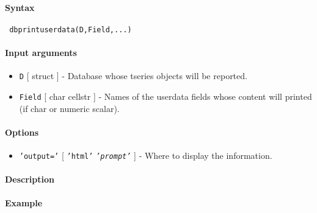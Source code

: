 


	\paragraph{Syntax}
 
 \begin{verbatim}
 dbprintuserdata(D,Field,...)
 \end{verbatim}
 
 \paragraph{Input arguments}
 
 \begin{itemize}
 \item
   \texttt{D} {[} struct {]} - Database whose tseries objects will be
   reported.
 \item
   \texttt{Field} {[} char \textbar{} cellstr {]} - Names of the userdata
   fields whose content will printed (if char or numeric scalar).
 \end{itemize}
 
 \paragraph{Options}
 
 \begin{itemize}
 \item
   \texttt{'output='} {[} \texttt{'html'} \textbar{}
   \emph{\texttt{'prompt'}} {]} - Where to display the information.
 \end{itemize}
 
 \paragraph{Description}
 
 \paragraph{Example}



